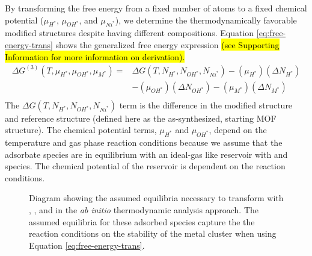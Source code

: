\documentclass[journal=jctcce,manuscript=article]{achemso}
\begin{document}
By transforming the free energy from a fixed number of atoms to a fixed chemical potential ($\mu_{H^{*}}$, $\mu_{OH^{*}}$, and $\mu_{Ni^{*}}$), we determine the thermodynamically favorable modified structures despite having different compositions. Equation \ref{eq:free-energy-trans} shows the generalized free energy expression \hl{(see Supporting Information for more information on derivation).}
\begin{equation}
    \begin{split}
        \Delta G^{(3)}(T,\mu_{H^{*}},\mu_{OH^{*}},\mu_{M^{*}})  = & \Delta G(T,N_{H^{*}},N_{OH^{*}},N_{Ni^{*}}) - (\mu_{H^{*}})(\Delta N_{H^{*}}) \\
        & - (\mu_{OH^{*}})(\Delta N_{OH^{*}}) 
          - (\mu_{M^{*}})(\Delta N_{M^{*}}) \\ 
    \end{split}
    \label{eq:free-energy-trans}
\end{equation}
The $\Delta G(T,N_{H^{*}},N_{OH^{*}},N_{Ni^{*}})$ term is the difference in the modified structure and reference structure (defined here as the as-synthesized, starting MOF structure). The chemical potential terms,  $\mu_{H^{*}}$ and $\mu_{OH^{*}}$, depend on the temperature and gas phase reaction conditions because we assume that the adsorbate species are in equilibrium with an ideal-gas like reservoir with  and  species. The chemical potential of the reservoir is dependent on the reaction conditions. 

\begin{figure}
    \centering
    \caption{Diagram showing the assumed equilibria necessary to transform with , , and  in the \textit{ab initio} thermodynamic analysis approach. The assumed equilibria for these adsorbed species capture the the reaction conditions on the stability of the metal cluster when using Equation \ref{eq:free-energy-trans}.}
    \label{fig:FPT-process}
\end{figure}
\end{document}
